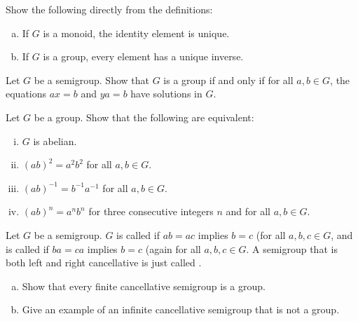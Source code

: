 \documentclass{problemset}
\begin{document}
\begin{exercise} Show the following directly from the definitions:
\begin{enumerate}[(a)]
\item If \(G\) is a monoid, the identity element is unique. 
\item If \(G\) is a group, every element has a unique inverse.
\end{enumerate}
\end{exercise}


\begin{exercise}
Let \(G\) be a semigroup. Show that \(G\) is a group if and only if for all \(a,b \in G\), the equations \(ax=b\) and \(ya=b\) have solutions in \(G\).
\end{exercise}


\begin{exercise}
Let \(G\) be a group.  Show that the following are equivalent:
\begin{enumerate}[(i)]
\item \(G\) is abelian.
\item \((ab)^2=a^2b^2\) for all \(a,b \in G\).
\item \((ab)^{-1}=b^{-1}a^{-1}\) for all \(a,b \in G\).
\item \((ab)^n=a^nb^n\) for three consecutive integers \(n\) and for all \(a,b \in G\).
\end{enumerate}
\end{exercise}


\begin{exercise}
Let \(G\) be a semigroup. \(G\) is called  if \(ab=ac\) implies \(b=c\) (for all \(a,b,c \in G\), and is called  if \(ba=ca\) implies \(b=c\) (again for all \(a,b,c \in G\).  A semigroup that is both left and right cancellative is just called . 
\begin{enumerate}[(a)]
\item Show that every finite cancellative semigroup is a group.
\item Give an example of an infinite cancellative semigroup that is not a group.
\end{enumerate}
\end{exercise}
\end{document}
